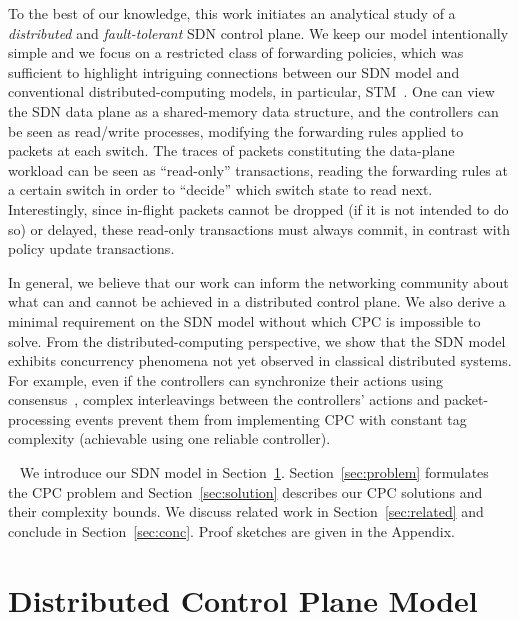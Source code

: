 \documentclass[11pt,pdftex,letter]{article}
\newcommand{\smartparagraph}[1]{\noindent{\bf #1}\ }
\begin{document}
To the best of our knowledge, this work initiates
an analytical study of a \emph{distributed} and \emph{fault-tolerant} SDN control plane.
We keep our model intentionally simple
and we  focus on a restricted class of forwarding
policies, which was sufficient to highlight
intriguing connections between our SDN model and conventional
distributed-computing models, in particular, STM~\cite{stm-st95}.
One can view the SDN data plane as a shared-memory data
structure, and the controllers can be seen as read/write processes,
modifying the forwarding rules applied to packets at each switch.
The traces of packets constituting the data-plane workload can be seen as
``read-only'' transactions, reading the
forwarding rules at a certain switch in order to ``decide'' which switch state to read
next.
Interestingly, since in-flight packets cannot be dropped (if it is not intended to do so) or delayed, these
read-only transactions must always commit, in contrast with policy update transactions.

In general, we believe that our work can inform the networking community about what can and
cannot be achieved in a distributed control plane.
We also derive a minimal requirement on the SDN model without which CPC is impossible to
solve.
From the distributed-computing perspective,
we show that the SDN model exhibits concurrency phenomena not
yet observed in classical distributed systems.
For example, even if the controllers can synchronize their actions using
consensus~\cite{Her91},  complex interleavings between the
controllers' actions and packet-processing events prevent them from implementing CPC with
constant tag complexity (achievable using one reliable controller).

\smartparagraph{Roadmap.} We introduce our
SDN model in Section~\ref{sec:model}. Section~\ref{sec:problem} formulates the CPC problem
and Section~\ref{sec:solution} describes our CPC solutions and their
complexity bounds. We discuss related work in
Section~\ref{sec:related} and conclude in Section~\ref{sec:conc}.
Proof sketches are given in the Appendix.


\section{Distributed Control Plane Model}\label{sec:model}
\end{document}
